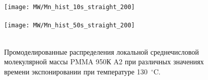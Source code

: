 \begin{figure}[t]
	\begin{center}
		\texttt{[image: MW/Mn\_hist\_10s\_straight\_200]} \\
		\vspace{-3.7em}  \vspace{2.7em} \\
		\texttt{[image: MW/Mn\_hist\_50s\_straight\_200]} \\
		\vspace{-3.7em}  \vspace{3.7em} \\
	\end{center}
	\vspace{-2.5em}
	\caption{Промоделированные распределения локальной среднечисловой молекулярной массы PMMA 950К A2 при различных значениях времени экспонировании при температуре 130~$^\circ$C.}
	\label{fig:Mn_hist}
\end{figure}




